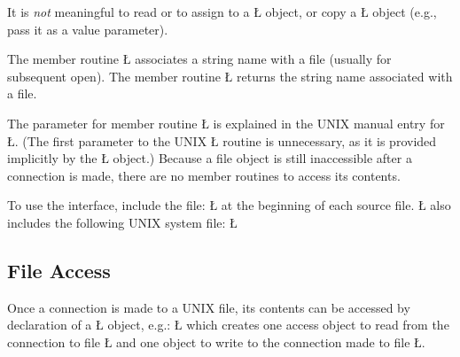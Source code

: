\documentclass[openright,twoside]{report}
\begin{document}
It is \emph{not} meaningful to read or to assign to a \LGinlinetrue\LGbegin\lgrinde\L{}\endlgrinde\LGend{} object, or copy a \LGinlinetrue\LGbegin\lgrinde\L{}\endlgrinde\LGend{} object (e.g., pass it as a value parameter).

The member routine \LGinlinetrue\LGbegin\lgrinde\L{}\endlgrinde\LGend{} associates a string name with a file (usually for subsequent open).
The member routine \LGinlinetrue\LGbegin\lgrinde\L{}\endlgrinde\LGend{} returns the string name associated with a file.

The parameter for member routine \LGinlinetrue\LGbegin\lgrinde\L{}\endlgrinde\LGend{} is explained in the UNIX manual entry for \LGinlinetrue\LGbegin\lgrinde\L{}\endlgrinde\LGend{}.
(The first parameter to the UNIX \LGinlinetrue\LGbegin\lgrinde\L{}\endlgrinde\LGend{} routine is unnecessary, as it is provided implicitly by the \LGinlinetrue\LGbegin\lgrinde\L{}\endlgrinde\LGend{} object.)
Because a file object is still inaccessible after a connection is made, there are no member routines to access its contents.

To use the interface, include the file:
\LGinlinefalse\LGbegin\lgrinde
\L{}
\endlgrinde\LGend
{}%
at the beginning of each source file.
\LGinlinetrue\LGbegin\lgrinde\L{}\endlgrinde\LGend{} also includes the following UNIX system file: \LGinlinetrue\LGbegin\lgrinde\L{}\endlgrinde\LGend{}%


\subsection{File Access}

Once a connection is made to a UNIX file, its contents can be accessed by declaration of a \LGinlinetrue\LGbegin\lgrinde\L{}\endlgrinde\LGend{} object, e.g.:
\LGinlinefalse\LGbegin\lgrinde
\L{}
\endlgrinde\LGend
which creates one access object to read from the connection to file \LGinlinetrue\LGbegin\lgrinde\L{}\endlgrinde\LGend{} and one object to write to the connection made to file \LGinlinetrue\LGbegin\lgrinde\L{}\endlgrinde\LGend{}.
\end{document}
